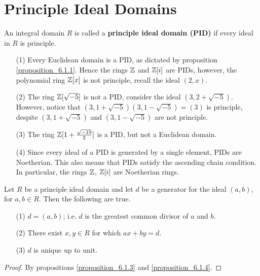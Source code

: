\section{Principle Ideal Domains}
\label{section_6.2}

\begin{definition}
  An integral domain $R$ is called a \textbf{principle ideal domain (PID)} if
  every ideal in $R$ is principle.
\end{definition}

\begin{example}\label{example_6.4}
  \begin{enumerate}
    \item[(1)] Every Euclidean domain is a PID, as dictated by proposition
      \ref{proposition_6.1.1}. Hence the rings $\mathbb{Z}$ and  $\mathbb{Z}[i]$ are PIDs, however,
      the polynomial ring $\mathbb{Z}[x]$ is not principle, recall the ideal
      $(2,x)$.

    \item[(2)] The ring $\mathbb{Z}[\sqrt{-5}]$ is not a PID, consider the ideal
      $(3,2+\sqrt{-5})$. However, notice that
      $(3,1+\sqrt{-5})(3,1-\sqrt{-5})=(3)$ is principle, despite
      $(3,1+\sqrt{-5})$ and $(3,1-\sqrt{-5})$ are not principle.

    \item[(3)] The ring $\mathbb{Z}[1+\frac{\sqrt{-19}}{2}]$ is a PID, but not a
      Euclidean domain.

    \item[(4)] Since every ideal of a PID is generated by a single
      element, PIDs are Noetherian. This also means that PIDs satisfy
      the ascending chain condition. In particular, the rings $\mathbb{Z}$,
      $\mathbb{Z}[i]$ are Noetherian rings.
  \end{enumerate}
\end{example}

\begin{proposition}\label{proposition_6.6.1}
  Let $R$ be a principle ideal domain and let $d$ be a generator for the ideal
  $(a,b)$, for $a,b \in R$. Then the following are true.
  \begin{enumerate}
    \item[(1)] $d=(a,b)$; i.e. $d$ is the greatest common divisor of $a$ and
      $b$.

    \item[(2)] There exist $x,y \in R$ for which  $ax+by=d$.

    \item[(3)] $d$ is unique up to unit.
  \end{enumerate}
\end{proposition}
\begin{proof}
  By propositions \ref{proposition_6.1.3} and \ref{proposition_6.1.4}.
\end{proof}

